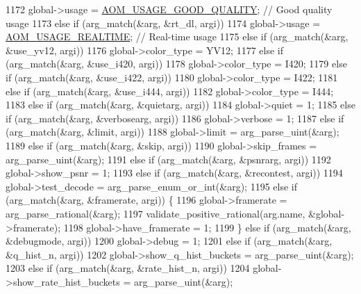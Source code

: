\begin{DoxyCodeInclude}
{{{{{{{{{{{{{{1172       global->usage = \hyperlink{group__encoder_ga03ca3defc61e1d70c34e9d94e7cee823}{AOM\_USAGE\_GOOD\_QUALITY};  \textcolor{comment}{// Good quality usage}
1173     \textcolor{keywordflow}{else} \textcolor{keywordflow}{if} (arg\_match(&arg, &rt\_dl, argi))
1174       global->usage = \hyperlink{group__encoder_gae2cc24d3083099df8eb60ad65f81c62f}{AOM\_USAGE\_REALTIME};  \textcolor{comment}{// Real-time usage}
1175     \textcolor{keywordflow}{else} \textcolor{keywordflow}{if} (arg\_match(&arg, &use\_yv12, argi))
1176       global->color\_type = YV12;
1177     \textcolor{keywordflow}{else} \textcolor{keywordflow}{if} (arg\_match(&arg, &use\_i420, argi))
1178       global->color\_type = I420;
1179     \textcolor{keywordflow}{else} \textcolor{keywordflow}{if} (arg\_match(&arg, &use\_i422, argi))
1180       global->color\_type = I422;
1181     \textcolor{keywordflow}{else} \textcolor{keywordflow}{if} (arg\_match(&arg, &use\_i444, argi))
1182       global->color\_type = I444;
1183     \textcolor{keywordflow}{else} \textcolor{keywordflow}{if} (arg\_match(&arg, &quietarg, argi))
1184       global->quiet = 1;
1185     \textcolor{keywordflow}{else} \textcolor{keywordflow}{if} (arg\_match(&arg, &verbosearg, argi))
1186       global->verbose = 1;
1187     \textcolor{keywordflow}{else} \textcolor{keywordflow}{if} (arg\_match(&arg, &limit, argi))
1188       global->limit = arg\_parse\_uint(&arg);
1189     \textcolor{keywordflow}{else} \textcolor{keywordflow}{if} (arg\_match(&arg, &skip, argi))
1190       global->skip\_frames = arg\_parse\_uint(&arg);
1191     \textcolor{keywordflow}{else} \textcolor{keywordflow}{if} (arg\_match(&arg, &psnrarg, argi))
1192       global->show\_psnr = 1;
1193     \textcolor{keywordflow}{else} \textcolor{keywordflow}{if} (arg\_match(&arg, &recontest, argi))
1194       global->test\_decode = arg\_parse\_enum\_or\_int(&arg);
1195     \textcolor{keywordflow}{else} \textcolor{keywordflow}{if} (arg\_match(&arg, &framerate, argi)) \{
1196       global->framerate = arg\_parse\_rational(&arg);
1197       validate\_positive\_rational(arg.name, &global->framerate);
1198       global->have\_framerate = 1;
1199     \} \textcolor{keywordflow}{else} \textcolor{keywordflow}{if} (arg\_match(&arg, &debugmode, argi))
1200       global->debug = 1;
1201     \textcolor{keywordflow}{else} \textcolor{keywordflow}{if} (arg\_match(&arg, &q\_hist\_n, argi))
1202       global->show\_q\_hist\_buckets = arg\_parse\_uint(&arg);
1203     \textcolor{keywordflow}{else} \textcolor{keywordflow}{if} (arg\_match(&arg, &rate\_hist\_n, argi))
1204       global->show\_rate\_hist\_buckets = arg\_parse\_uint(&arg);
}}}}}}}}}}}}}}
\end{DoxyCodeInclude}
